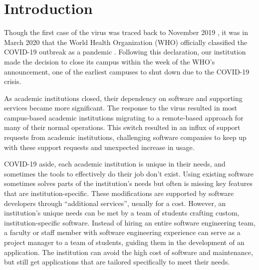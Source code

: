 \section{Introduction}


Though the first case of the virus was traced back to November 2019 \cite{}, it was in March 2020 that the World Health Organization (WHO) officially classified the COVID-19 outbreak as a pandemic \cite{}. Following this declaration, our institution made the decision to close its campus within the week of the WHO's announcement, one of the earliest campuses to shut down due to the COVID-19 crisis.

As academic institutions closed, their dependency on software and supporting services became more significant. The response to the virus resulted in most campus-based academic institutions migrating to a remote-based approach for many of their normal operations. This switch resulted in an influx of support requests from academic institutions, challenging software companies to keep up with these support requests and unexpected increase in usage.

COVID-19 aside, each academic institution is unique in their needs, and sometimes the tools to effectively do their job don't exist. Using existing software sometimes solves parts of the institution's needs but often is missing key features that are institution-specific. These modifications are supported by software developers through ``additional services”, usually for a cost. However, an institution's unique needs can be met by a team of students crafting custom, institution-specific software. Instead of hiring an entire software engineering team, a faculty or staff member with software engineering experience can serve as a project manager to a team of students, guiding them in the development of an application. The institution can avoid the high cost of software and maintenance, but still get applications that are tailored specifically to meet their needs.

